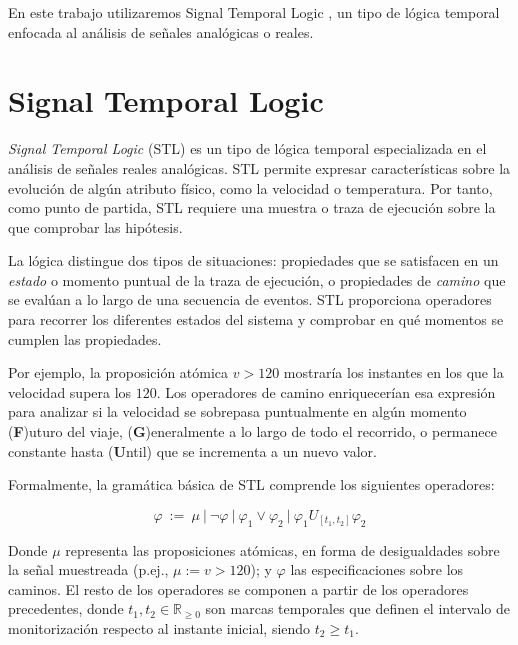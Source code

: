 En este trabajo utilizaremos Signal Temporal Logic \cite{STL}, un tipo de lógica temporal enfocada al análisis de señales analógicas o reales.


\section{Signal Temporal Logic}
\textit{Signal Temporal Logic} (STL) \cite{STL} es un tipo de lógica temporal especializada en el análisis de señales reales analógicas. STL permite expresar características sobre la evolución de algún atributo físico, como la velocidad o temperatura. Por tanto, como punto de partida, STL requiere una muestra o traza de ejecución sobre la que comprobar las hipótesis.

La lógica distingue dos tipos de situaciones: propiedades que se satisfacen en un \textit{estado} o momento puntual de la traza de ejecución, o propiedades de \textit{camino} que se evalúan a lo largo de una secuencia de eventos. STL proporciona operadores para recorrer los diferentes estados del sistema y comprobar en qué momentos se cumplen las propiedades.

Por ejemplo, la proposición atómica $v > 120$ mostraría los instantes en los que la velocidad supera los $120$. Los operadores de camino enriquecerían esa expresión para analizar si la velocidad se sobrepasa puntualmente en algún momento (\textbf{F})uturo del viaje, (\textbf{G})eneralmente a lo largo de todo el recorrido, o permanece constante hasta (\textbf{U}ntil) que se incrementa a un nuevo valor. 

Formalmente, la gramática básica de STL comprende los siguientes operadores:

$$ \varphi \ := \ \mu \ |\ \neg \varphi \ |\ \varphi_{1} \lor \varphi_{2} \ |\ \varphi_{1} U_{[t_1, t_2]} \varphi_{2}$$

Donde $\mu$ representa las proposiciones atómicas, en forma de desigualdades sobre la señal muestreada (p.ej., $\mu := v > 120$); y $\varphi$ las especificaciones sobre los caminos. El resto de los operadores se componen a partir de los operadores precedentes, donde $t_1, t_2 \in \mathbb{R}_{\geq 0}$ son marcas temporales que definen el intervalo de monitorización respecto al instante inicial, siendo $t_2 \geq t_1$. 



